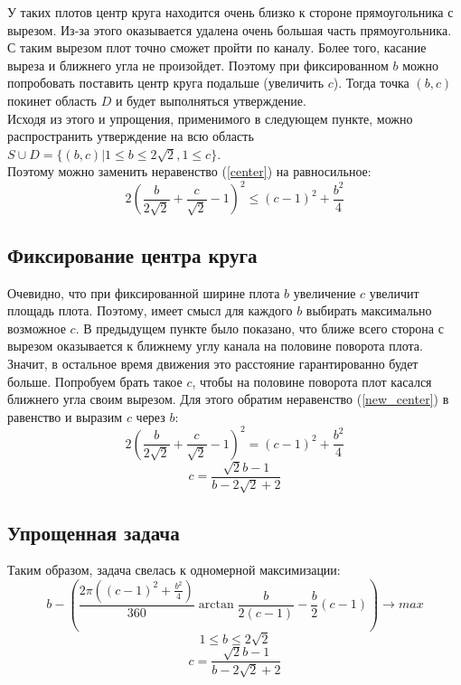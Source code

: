 У таких плотов центр круга находится очень близко к стороне прямоугольника с вырезом. Из-за этого оказывается удалена очень большая часть прямоугольника. С таким вырезом плот точно сможет пройти по каналу. Более того, касание выреза и ближнего угла не произойдет. Поэтому при фиксированном $b$ можно попробовать поставить центр круга подальше (увеличить $c$). Тогда точка $(b,c)$ покинет область $D$ и будет выполняться утверждение. \\

Исходя из этого и упрощения, применимого в следующем пункте, можно распространить утверждение на всю область $S \cup D=\{(b,c) | 1 \leq b \leq 2\sqrt{2}, 1 \leq c \}$. \\

Поэтому можно заменить неравенство (\ref{center}) на равносильное:
\begin{equation} \label{new_center}
2( \frac{b}{2\sqrt{2}}+\frac{c}{\sqrt{2}} - 1)^2\leq (c-1)^2+\frac{b^2}{4}
\end{equation}


\subsection{Фиксирование центра круга}
Очевидно, что при фиксированной ширине плота $b$ увеличение $c$ увеличит площадь плота. Поэтому, имеет смысл для каждого $b$ выбирать максимально возможное $c$. В предыдущем пункте было показано, что ближе всего сторона с вырезом оказывается к ближнему углу канала на половине поворота плота. Значит, в остальное время движения это расстояние гарантированно будет больше. Попробуем брать такое $c$, чтобы на половине поворота плот касался ближнего угла своим вырезом. Для этого обратим неравенство (\ref{new_center}) в равенство и выразим $c$ через $b$:
\begin{equation}
2( \frac{b}{2\sqrt{2}}+\frac{c}{\sqrt{2}} - 1)^2 = (c-1)^2+\frac{b^2}{4}
\end{equation}
\begin{equation}
c=\frac{\sqrt{2}b-1}{b-2\sqrt{2}+2}
\end{equation}


\subsection{Упрощенная задача}
Таким образом, задача свелась к одномерной максимизации:
\begin{equation}
b-(\frac{2\pi ((c-1)^2+\frac{b^2}{4})}{360} \arctan{\frac{b}{2(c-1)}} - \frac{b}{2}(c-1)) \rightarrow max
\end{equation}
\begin{equation}
1 \leq b \leq 2\sqrt{2}
\end{equation}
\begin{equation}
c=\frac{\sqrt{2}b-1}{b-2\sqrt{2}+2}
\end{equation}



